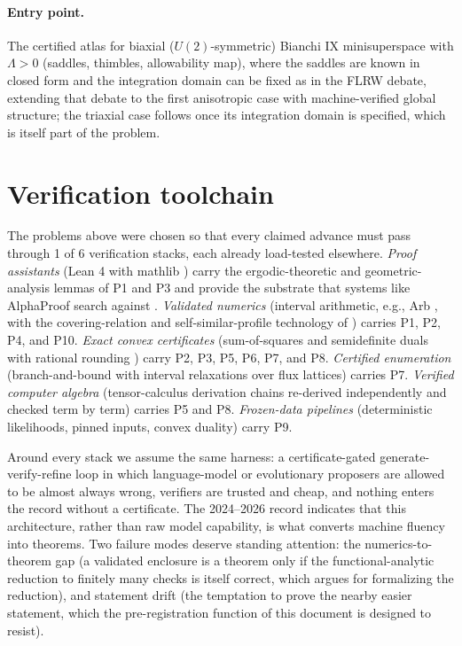 \documentclass[11pt,letterpaper]{article}
\begin{document}
\paragraph{Entry point.} The certified atlas for biaxial ($U(2)$-symmetric) Bianchi IX minisuperspace with $\Lambda>0$ (saddles, thimbles, allowability map), where the saddles are known in closed form \cite{jhh2019} and the integration domain can be fixed as in the FLRW debate, extending that debate to the first anisotropic case with machine-verified global structure; the triaxial case follows once its integration domain is specified, which is itself part of the problem.

\section{Verification toolchain}
\label{sec:toolchain}

The problems above were chosen so that every claimed advance must pass through 1 of 6 verification stacks, each already load-tested elsewhere. \emph{Proof assistants} (Lean 4 with mathlib \cite{mathlib2020}) carry the ergodic-theoretic and geometric-analysis lemmas of P1 and P3 and provide the substrate that systems like AlphaProof search against \cite{hubert2025,nexus2026}. \emph{Validated numerics} (interval arithmetic, e.g., Arb \cite{arb2017}, with the covering-relation and self-similar-profile technology of \cite{tucker2002,chenhou2022,gomezserrano2019}) carries P1, P2, P4, and P10. \emph{Exact convex certificates} (sum-of-squares and semidefinite duals with rational rounding \cite{parrilo2003,sdpb2015}) carry P2, P3, P5, P6, P7, and P8. \emph{Certified enumeration} (branch-and-bound with interval relaxations over flux lattices) carries P7. \emph{Verified computer algebra} (tensor-calculus derivation chains re-derived independently and checked term by term) carries P5 and P8. \emph{Frozen-data pipelines} (deterministic likelihoods, pinned inputs, convex duality) carry P9.

Around every stack we assume the same harness: a certificate-gated generate-verify-refine loop in which language-model or evolutionary proposers are allowed to be almost always wrong, verifiers are trusted and cheap, and nothing enters the record without a certificate. The 2024--2026 record \cite{romera2024,georgiev2025,wang2023,nexus2026} indicates that this architecture, rather than raw model capability, is what converts machine fluency into theorems. Two failure modes deserve standing attention: the numerics-to-theorem gap (a validated enclosure is a theorem only if the functional-analytic reduction to finitely many checks is itself correct, which argues for formalizing the reduction), and statement drift (the temptation to prove the nearby easier statement, which the pre-registration function of this document is designed to resist).
\end{document}
